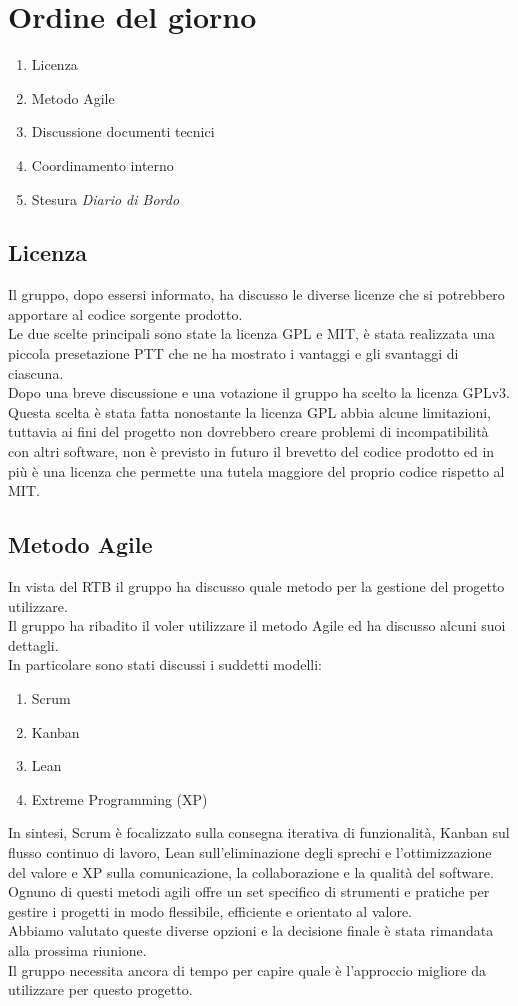 \section{Ordine del giorno}
\begin{enumerate}
\item Licenza
\item Metodo Agile
\item Discussione documenti tecnici
\item Coordinamento interno 
\item Stesura \textit{Diario di Bordo}
\end{enumerate}

\subsection{Licenza}
Il gruppo, dopo essersi informato, ha discusso le diverse licenze che si potrebbero apportare al codice sorgente prodotto.\\
Le due scelte principali sono state la licenza GPL e MIT, è stata realizzata una piccola presetazione PTT che ne ha mostrato i vantaggi e gli svantaggi di ciascuna.\\
Dopo una breve discussione e una votazione il gruppo ha scelto la licenza GPLv3. 
Questa scelta è stata fatta nonostante la licenza GPL abbia alcune limitazioni, tuttavia ai fini del progetto non dovrebbero creare problemi
di incompatibilità con altri software, non è previsto in futuro il brevetto del codice prodotto ed in più è una licenza che permette una tutela maggiore del proprio
codice rispetto al MIT.

\subsection{Metodo Agile}
In vista del RTB il gruppo ha discusso quale metodo per la gestione del progetto utilizzare.\\
Il gruppo ha ribadito il voler utilizzare il metodo Agile ed ha discusso alcuni suoi dettagli.\\
In particolare sono stati discussi i suddetti modelli:
\begin{enumerate}
    \item Scrum
    \item Kanban
    \item Lean
    \item Extreme Programming (XP)
\end{enumerate}
In sintesi, Scrum è focalizzato sulla consegna iterativa di funzionalità, 
Kanban sul flusso continuo di lavoro, 
Lean sull'eliminazione degli sprechi e l'ottimizzazione del valore e XP sulla comunicazione, 
la collaborazione e la qualità del software.\\
Ognuno di questi metodi agili offre un set specifico di strumenti e pratiche per gestire i progetti in modo flessibile, efficiente e orientato al valore.\\
Abbiamo valutato queste diverse opzioni e la decisione finale è stata rimandata alla prossima riunione.\\
Il gruppo necessita ancora di tempo per capire quale è l'approccio migliore da utilizzare per questo progetto.

